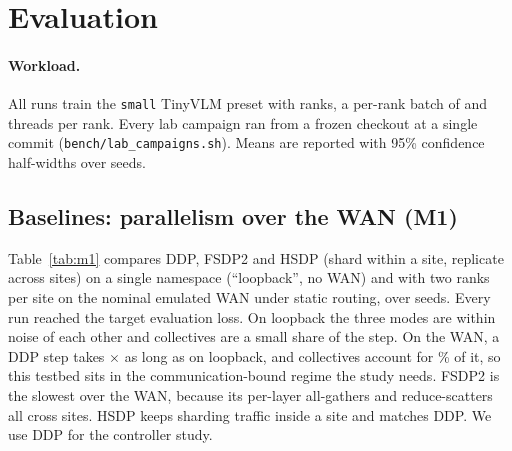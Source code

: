 \section{Evaluation}
\label{sec:eval}

\paragraph{Workload.}
All runs train the \texttt{small} TinyVLM preset with  ranks, a per-rank batch of  and
 threads per rank. Every lab campaign ran from a frozen checkout at a single commit
(\texttt{bench/lab\_campaigns.sh}). Means are reported with 95\% confidence half-widths over seeds.

\subsection{Baselines: parallelism over the WAN (M1)}
\label{sec:eval-m1}
Table~\ref{tab:m1} compares DDP, FSDP2 and HSDP (shard within a site, replicate across sites) on a single
namespace (``loopback'', no WAN) and with two ranks per site on the nominal emulated WAN under static
routing, over \CmOneSeeds{} seeds. Every run reached the target evaluation loss. On loopback the three modes
are within noise of each other and collectives are a small share of the step. On the WAN, a DDP step takes
\CmOneWanOverLoDdp$\times$ as long as on loopback, and collectives account for \CmOneWanDdpColl\% of it, so
this testbed sits in the communication-bound regime the study needs. FSDP2 is the slowest over the WAN,
because its per-layer all-gathers and reduce-scatters all cross sites. HSDP keeps sharding traffic inside
a site and matches DDP. We use DDP for the controller study.

